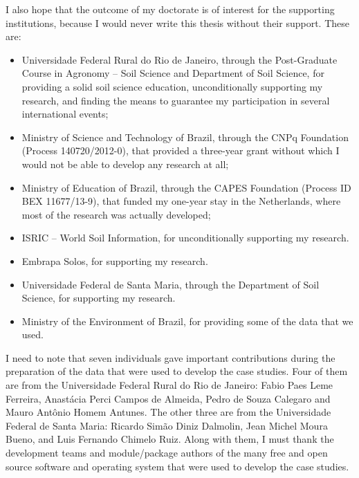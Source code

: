 I also hope that the outcome of my doctorate is of interest for the supporting institutions, 
because I would never write this thesis without their support. These are:

\begin{itemize}
 \item Universidade Federal Rural do Rio de Janeiro, through the Post-Graduate Course in Agronomy -- Soil 
 Science and Department of Soil Science, for providing a solid soil science education, unconditionally 
 supporting my research, and finding the means to guarantee my participation in several international events;
 
 \item Ministry of Science and Technology of Brazil, through the CNPq Foundation (Process 140720/2012-0), that
 provided a three-year grant without which I would not be able to develop any research at all;
 
 \item Ministry of Education of Brazil, through the CAPES Foundation (Process ID BEX 11677/13-9), that funded
 my one-year stay in the Netherlands, where most of the research was actually developed;
 
 \item ISRIC -- World Soil Information, for unconditionally supporting my research.
 
 \item Embrapa Solos, for supporting my research.
 
 \item Universidade Federal de Santa Maria, through the Department of Soil Science, for supporting my research.

 \item Ministry of the Environment of Brazil, for providing some of the data that we used.
\end{itemize}

I need to note that seven individuals gave important contributions during the preparation of the data that 
were used to develop the case studies. Four of them are from the Universidade Federal Rural do Rio de Janeiro: 
Fabio Paes Leme Ferreira, Anastácia Perci Campos de Almeida, Pedro de Souza Calegaro and Mauro Antônio Homem 
Antunes. The other three are from the Universidade Federal de Santa Maria: Ricardo Simão Diniz Dalmolin, 
Jean Michel Moura Bueno, and Luis Fernando Chimelo Ruiz. Along with them, I must thank the development teams 
and module/package authors of the many free and open source software and operating system that were used to 
develop the case studies.

